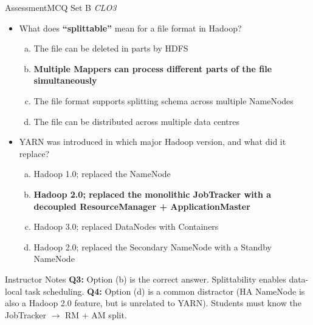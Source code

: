 \documentclass[aspectratio=169,10pt]{beamer}
\begin{document}
\begin{frame}{Assessment\textemdash MCQ Set B \hfill\small\textit{CLO3}}
  \vspace{6pt}
  \begin{itemize}
    \item[\textbf{Q3.}] What does \textbf{``splittable''} mean for a file format in Hadoop?
    \begin{enumerate}[(a)]
      \item The file can be deleted in parts by HDFS
      \item \textbf{Multiple Mappers can process different parts of the file simultaneously}
      \item The file format supports splitting schema across multiple NameNodes
      \item The file can be distributed across multiple data centres
    \end{enumerate}
  \end{itemize}
  \vspace{8pt}
  \begin{itemize}
    \item[\textbf{Q4.}] YARN was introduced in which major Hadoop version, and what did it replace?
    \begin{enumerate}[(a)]
      \item Hadoop 1.0; replaced the NameNode
      \item \textbf{Hadoop 2.0; replaced the monolithic JobTracker with a decoupled ResourceManager + ApplicationMaster}
      \item Hadoop 3.0; replaced DataNodes with Containers
      \item Hadoop 2.0; replaced the Secondary NameNode with a Standby NameNode
    \end{enumerate}
  \end{itemize}
  \vspace{8pt}
  \begin{alertblock}{Instructor Notes}
    \textbf{Q3:} Option (b) is the correct answer.  Splittability enables data-local task scheduling.  \textbf{Q4:} Option (d) is a common distractor (HA NameNode is also a Hadoop 2.0 feature, but is unrelated to YARN).  Students must know the JobTracker $\to$ RM + AM split.
  \end{alertblock}
\end{frame}
\end{document}
